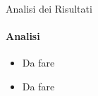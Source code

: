 \documentclass[
 ]{beamer}
\begin{document}

\begin{frame}{Analisi dei Risultati}
    \framesubtitle{Analisi}
    \smallskip
    \begin{itemize} [<+->]
        \setlength\itemsep{2em}
        \item \large Da fare %
        \item \large Da fare %
    \end{itemize}     
\end{frame}
\end{document}
